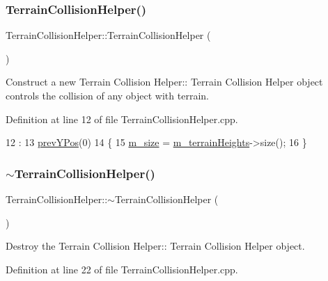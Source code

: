 \subsubsection{\texorpdfstring{Terrain\+Collision\+Helper()}{TerrainCollisionHelper()}}
{\footnotesize\ttfamily Terrain\+Collision\+Helper\+::\+Terrain\+Collision\+Helper (\begin{DoxyParamCaption}{ }\end{DoxyParamCaption})}



Construct a new Terrain Collision Helper\+:\+: Terrain Collision Helper object controls the collision of any object with terrain. 



Definition at line 12 of file Terrain\+Collision\+Helper.\+cpp.


\begin{DoxyCode}
12                                                :
13     \mbox{\hyperlink{class_terrain_collision_helper_a3418ac5abfc56f291e2ca54a8661513a}{prevYPos}}(0)
14 \{
15     \mbox{\hyperlink{class_terrain_collision_helper_af9623630d3c1c2848b80aa3ccbb249ce}{m\_size}} = \mbox{\hyperlink{class_terrain_collision_helper_a479800d07e04731ce3ac8093aba52fa0}{m\_terrainHeights}}->size();
16 \}
\end{DoxyCode}
\mbox{\label{class_terrain_collision_helper_ae9cbd2eca918548415c2f2439e214b07}} 
\subsubsection{\texorpdfstring{$\sim$\+Terrain\+Collision\+Helper()}{~TerrainCollisionHelper()}}
{\footnotesize\ttfamily Terrain\+Collision\+Helper\+::$\sim$\+Terrain\+Collision\+Helper (\begin{DoxyParamCaption}{ }\end{DoxyParamCaption})}



Destroy the Terrain Collision Helper\+:\+: Terrain Collision Helper object. 



Definition at line 22 of file Terrain\+Collision\+Helper.\+cpp.


